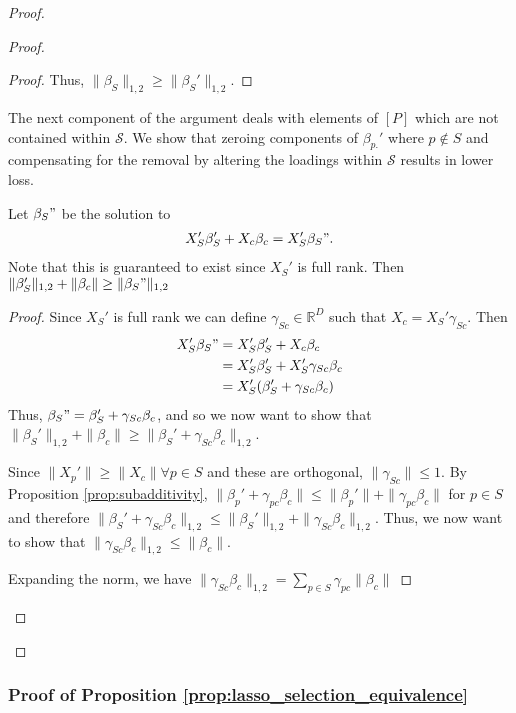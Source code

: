 \begin{proof}
\begin{proof}
\begin{proof}
Thus, $\|\beta_S\|_{1,2} \geq \|\beta_S'\|_{1,2}$.

\end{proof}

The next component of the argument deals with elements of $[P]$ which are not contained within $\mathcal S$.
We show that zeroing components of $\beta_{p.}'$ where $p \not \in S$ and compensating for the removal by altering the loadings within $\mathcal S$ results in lower loss.

\begin{proposition}
Let $\beta_S"$ be the solution to
\begin{align}
X_S' \beta_S ' + X_c \beta_c = X_S' \beta_S".
\end{align}
Note that this is guaranteed to exist since $X_S'$ is full rank.  
Then $\|\beta_{S}'\|_{1,2} + \|\beta_c\| \geq \|\beta_S"\|_{1,2}$
\end{proposition}

\begin{proof}
Since $X_S'$ is full rank we can define $\gamma_{Sc} \in \mathbb R^D$ such that $X_c = X_S' \gamma_{Sc}$.
Then 
\begin{align}
X_S' \beta_S" &= X_S' \beta_S ' + X_c \beta_c \\
&= X_S' \beta_S ' + X_S' \gamma_{Sc} \beta_c \\
&= X_S'( \beta_S ' + \gamma_{Sc} \beta_c )
\end{align}
Thus, $\beta_S" = \beta_S' + \gamma_{Sc}\beta_c$, and so we now want to show that $\|\beta_S'\|_{1,2} + \|\beta_c\| \geq \| \beta_S' + \gamma_{Sc}\beta_c\|_{1,2}$.

Since $\|X_p'\| \geq \|X_c\| \forall p \in S$ and these are orthogonal, $\|\gamma_{Sc}\| \leq 1$. %
By Proposition \ref{prop:subadditivity},  $\| \beta_p' + \gamma_{pc}\beta_c\| \leq \|\beta_p'\| + \|\gamma_{pc}\beta_c\|$ for $p \in S$ and therefore $ \| \beta_S' + \gamma_{Sc}\beta_c\|_{1,2} \leq \| \beta_S' \|_{1,2}+ \| \gamma_{Sc}\beta_c\|_{1,2}$.
Thus, we now want to show that $\| \gamma_{Sc}\beta_c\|_{1,2} \leq \|\beta_c\|$.

Expanding the norm, we have $\| \gamma_{Sc}\beta_c\|_{1,2}  = \sum_{p\in S} \gamma_{pc} \|\beta_c\|$
\end{proof}
\end{proof}

\end{proof}
\subsubsection{Proof of Proposition \ref{prop:lasso_selection_equivalence} }

